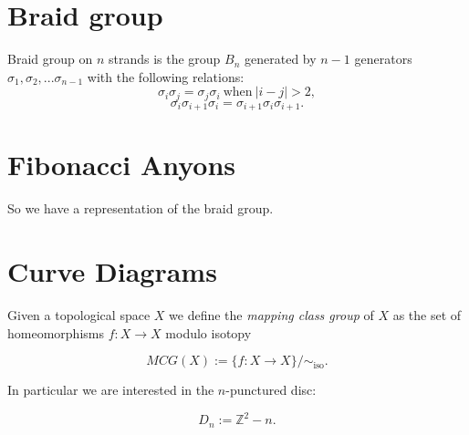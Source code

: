 \documentclass[12pt]{article}
\begin{document}
\maketitle

\def\Complex {C}
\def\tensor{\otimes}
\def\Tensor{\bigotimes}
\def\bra #1{\langle #1|}
\def\ket #1{|#1\rangle}
\def\braket #1#2{\langle #1|#2 \rangle}



\def\mathZ{\mathbb{Z}}
\def\mathR{\mathbb{R}}



%

\section{Braid group}

Braid group on $n$ strands is the group $B_n$ generated by $n-1$ generators
$\sigma_1, \sigma_2, ... \sigma_{n-1}$ with the following relations:
    $$ \sigma_i \sigma_j = \sigma_j \sigma_i \ \text{when}\ |i-j| > 2, $$
    $$ \sigma_i \sigma_{i+1} \sigma_i =  \sigma_{i+1} \sigma_i \sigma_{i+1}.$$


\section{Fibonacci Anyons}


So we have a representation of the braid group.

\section{Curve Diagrams}


Given a topological space $X$ we define the {\it mapping class group} of $X$ as
the set of homeomorphisms $f:X\to X$ modulo isotopy

    $$ MCG(X) := \{ f : X \to X \} / \sim_{\text{iso}}.$$


In particular we are interested in the $n$-punctured disc:

    $$ D_n := \mathZ^2 - n.$$
\end{document}
